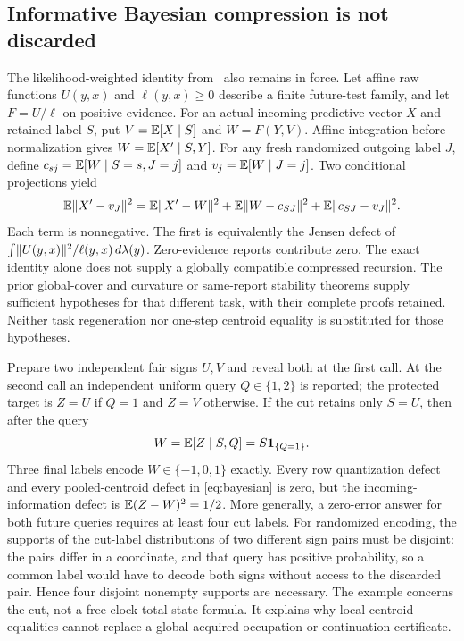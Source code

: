 \subsection*{Informative Bayesian compression is not discarded}
The likelihood-weighted identity from~\cite{GTF32} also remains in force. Let affine raw functions $U(y,x)$ and $\ell(y,x)\ge0$ describe a finite future-test family, and let $F=U/\ell$ on positive evidence. For an actual incoming predictive vector $X$ and retained label $S$, put $V=\mathbb E[X\mid S]$ and $W=F(Y,V)$. Affine integration before normalization gives $W=\mathbb E[X'\mid S,Y]$. For any fresh randomized outgoing label $J$, define $c_{sj}=\mathbb E[W\mid S=s,J=j]$ and $v_j=\mathbb E[W\mid J=j]$. Two conditional projections yield
\begin{equation}\label{eq:bayesian}
 \mathbb E\lVert X'-v_J\rVert^2
 =\mathbb E\lVert X'-W\rVert^2
  +\mathbb E\lVert W-c_{SJ}\rVert^2+\mathbb E\lVert c_{SJ}-v_J\rVert^2.
\end{equation}
Each term is nonnegative. The first is equivalently the Jensen defect of $\int\lVert U(y,x)\rVert^2/\ell(y,x)\,d\lambda(y)$. Zero-evidence reports contribute zero. The exact identity alone does not supply a globally compatible compressed recursion. The prior global-cover and curvature or same-report stability theorems supply sufficient hypotheses for that different task, with their complete proofs retained. Neither task regeneration nor one-step centroid equality is substituted for those hypotheses.


\begin{example}\label{ex:continuation}
Prepare two independent fair signs $U,V$ and reveal both at the first call. At the second call an independent uniform query $Q\in\{1,2\}$ is reported; the protected target is $Z=U$ if $Q=1$ and $Z=V$ otherwise. If the cut retains only $S=U$, then after the query
\[
 W=\mathbb E[Z\mid S,Q]=S\mathbf1_{\{Q=1\}}.
\]
Three final labels encode $W\in\{-1,0,1\}$ exactly. Every row quantization defect and every pooled-centroid defect in \eqref{eq:bayesian} is zero, but the incoming-information defect is $\mathbb E(Z-W)^2=1/2$. More generally, a zero-error answer for both future queries requires at least four cut labels. For randomized encoding, the supports of the cut-label distributions of two different sign pairs must be disjoint: the pairs differ in a coordinate, and that query has positive probability, so a common label would have to decode both signs without access to the discarded pair. Hence four disjoint nonempty supports are necessary. The example concerns the cut, not a free-clock total-state formula. It explains why local centroid equalities cannot replace a global acquired-occupation or continuation certificate.
\end{example}
